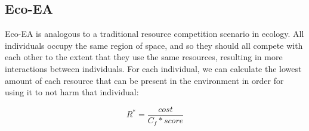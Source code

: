 



\subsection{Eco-EA}

Eco-EA is analogous to a traditional resource competition scenario in ecology. All individuals occupy the same region of space, and so they should all compete with each other to the extent that they use the same resources, resulting in more interactions between individuals. For each individual, we can calculate the lowest amount of each resource that can be present in the environment in order for using it to not harm that individual:

\begin{equation}
R^* = \frac{cost}{C_f * score}
\label{eq:ecoea-rstar}
\end{equation}

